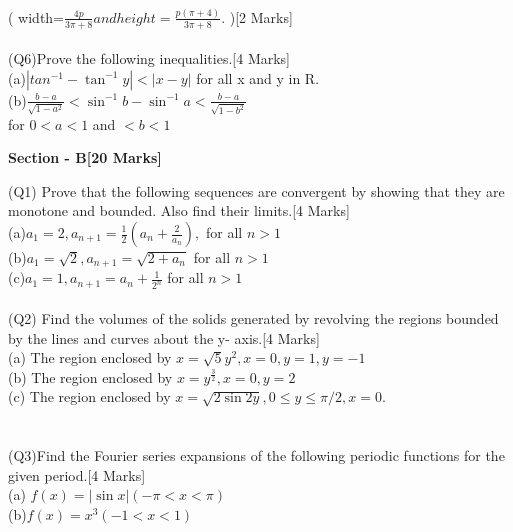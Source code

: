 \documentclass[12pt]{article}
\begin{document}
{		\\( width=$ \frac{4p} {3\pi +8} and height = \frac{p(\pi +4)}{3\pi +8}$. )\hspace*{6.1cm}[2 Marks]
		\\\\(Q6)Prove the following inequalities.\hspace*{6cm}[4 Marks]
		\\(a)$|tan ^{-1}- \tan ^{-1}y|<|x-y|$ for all x and y in R.
		\\(b)$\frac{b-a}{\sqrt{1-a^2}}< \sin ^{-1}b -\sin ^{-1}a <\frac{b-a}{\sqrt{1-b^2}} $ \\ \hspace*{0.6cm} for $0<a<1$  and  $<b<1$
		
		\newpage
		\begin{center}
			\textbf{Section - B\hspace*{8cm}[20 Marks]}
		\end{center}
		(Q1) Prove that the following sequences are convergent by showing that they are monotone and bounded. Also find their limits.\hspace*{3cm}[4 Marks]\\
		(a)$a_{1}=2,a_{n+1} = \frac{1}{2}(a_{n} + \frac{2}{a_{n}}),$ for all $n>1$ \\
		(b)$a_{1}=\sqrt{2} ,a_{n+1}=\sqrt{2+a_{n}}$ for all $n>1$  \\
		\hspace*{0.6cm} (c)$a_{1}=1 ,a_{n+1}=a_{n} + \frac{1}{2^{n}}$ for all $n>1$
		\\\\(Q2) Find the volumes of the solids generated by revolving the regions bounded by the lines and curves about the y- axis.\hspace*{3cm}[4 Marks]\\
		(a) The region enclosed by $x = \sqrt{5}y^2 , x = 0, y=1,y= -1$\\
		(b) The region enclosed by $x = y^\frac{3}{2} , x=0 , y= 2$\\
		(c) The region enclosed by $ x = \sqrt{2\sin 2y}, 0 \leq y \leq \pi/2 , x=0.$\\\\\\
		(Q3)Find the Fourier series expansions of the following periodic functions for the given period.\hspace*{9cm}[4 Marks]\\
		(a) $f(x) = |\sin x| ({-\pi}< x < \pi)$\\
		(b)$ f(x) = x^3 ({-1} < x < 1)$\\
}
\end{document}
